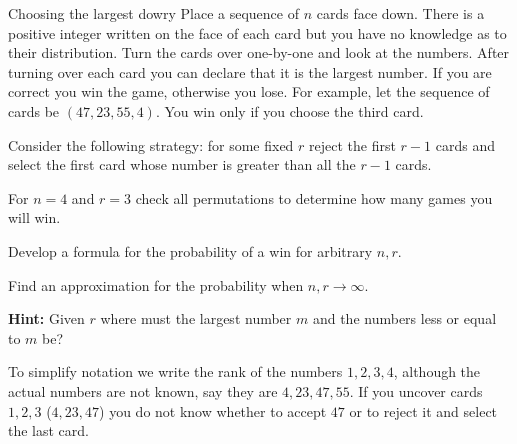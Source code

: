 
\begin{prob}{Choosing the largest dowry}
Place a sequence of $n$ cards face down. There is a positive integer written on the face of each card but you have no knowledge as to their distribution. Turn the cards over one-by-one and look at the numbers. After turning over each card you can declare that it is the largest number. If you are correct you win the game, otherwise you lose. For example, let the sequence of cards be $(47, 23, 55, 4)$. You win only if you choose the third card.

Consider the following strategy: for some fixed $r$ reject the first $r-1$ cards and select the first card whose number is greater than all the $r-1$ cards.

 For $n=4$ and $r=3$ check all permutations to determine how many games you will win.

 Develop a formula for the probability of a win for arbitrary $n, r$.

 Find an approximation for the probability when $n,r\rightarrow \infty$.

\textbf{Hint:} Given $r$ where must the largest number $m$ and the numbers less or equal to $m$ be? 

\end{prob}

\solution{}

To simplify notation we write the rank of the numbers $1,2,3,4$, although the actual numbers are not known, say they are $4,23,47,55$. If you uncover cards $1,2,3$ ($4,23,47$) you do not know whether to accept $47$ or to reject it and select the last card.

